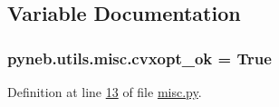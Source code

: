 \subsection{Variable Documentation}
\hypertarget{namespacepyneb_1_1utils_1_1misc_ac06a00191494a0f2d86df407a02b358a}{
\subsubsection[{cvxopt\-\_\-ok}]{\setlength{\rightskip}{0pt plus 5cm}pyneb.\-utils.\-misc.\-cvxopt\-\_\-ok = True}}\label{namespacepyneb_1_1utils_1_1misc_ac06a00191494a0f2d86df407a02b358a}


Definition at line \hyperlink{misc_8py_source_l00013}{13} of file \hyperlink{misc_8py_source}{misc.\-py}.

